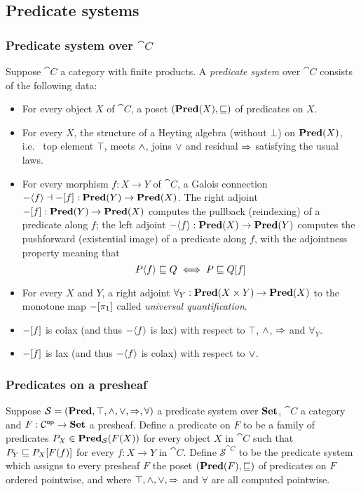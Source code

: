 \subsection{Predicate systems}
\label{sec:predicate-system}

\subsubsection{Predicate system over $\cat{C}$}

Suppose $\cat{C}$ a category with finite products. A \emph{predicate system} over $\cat{C}$ consists of the
following data:
\begin{itemize}
\item For every object $X$ of $\cat{C}$, a poset $(\mathbf{Pred}(X), \sqsubseteq)$ of predicates on $X$.
\item For every $X$, the structure of a Heyting algebra (without $\bot$) on $\mathbf{Pred}(X)$, i.e.~ top element
   $\top$, meets $\wedge$, joins $\vee$ and residual $\Rightarrow$ satisfying the usual laws.
\item For every morphism $f: X \to Y$ of $\cat{C}$, a Galois connection $-\langle f\rangle \dashv
-[f] : \mathbf{Pred}(Y) \to \mathbf{Pred}(X)$. The right adjoint $-[f]: \mathbf{Pred}(Y) \to \mathbf{Pred}(X)$ computes
the pullback (reindexing) of a predicate along $f$; the left adjoint $-\langle f\rangle: \mathbf{Pred}(X) \to
\mathbf{Pred}(Y)$ computes the pushforward (existential image) of a predicate along $f$, with the adjointness property
meaning that
\[P\langle f\rangle \sqsubseteq Q \iff P \sqsubseteq Q[f] \]
\item For every $X$ and $Y$, a right adjoint $\forall_Y: \mathbf{Pred}(X \times Y) \to \mathbf{Pred}(X)$ to the monotone map
$-[\pi_1]$ called \emph{universal quantification}. 
\item $-[f]$ is colax (and thus $-\langle f\rangle$ is lax) with respect to $\top$, $\wedge$,
$\Rightarrow$ and $\forall_Y$.
\item $-[f]$ is lax (and thus $-\langle f\rangle$ is colax) with respect to $\vee$.
\end{itemize}

\subsubsection{Predicates on a presheaf}

Suppose $\mathcal{S} = (\mathbf{Pred}, \top, \wedge, \vee, \Rightarrow, \forall)$ a predicate system over $\mathbf{Set}$,
$\cat{C}$ a category and $F: \mathcal{C}^{\mathsf{op}} \to \mathbf{Set}$ a presheaf. Define a predicate on $F$ to be a family of
predicates $P_X \in \mathbf{Pred}_\mathcal{S}(F(X))$ for every object $X$ in $\cat{C}$ such that $P_Y \sqsubseteq
P_X[F(f)]$ for every $f: X \to Y$ in $\cat{C}$. Define $\mathcal{S}^{\cat{C}}$ to be the predicate
system which assigns to every presheaf $F$ the poset $(\mathbf{Pred}(F), \sqsubseteq)$ of predicates on $F$ ordered
pointwise, and where $\top, \wedge, \vee, \Rightarrow$ and $\forall$ are all computed pointwise.
